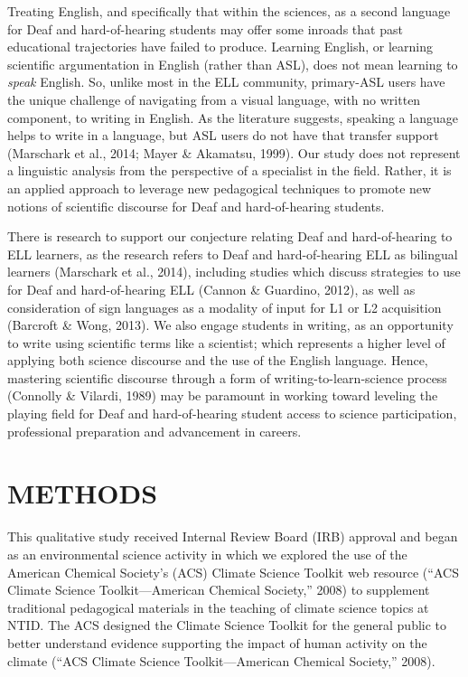 \documentclass[11.5pt]{sig-alternate} %
\begin{document}
\begin{large}
Treating English, and specifically that within the sciences, as a second language for Deaf and hard-of-hearing students may offer some inroads that past educational trajectories have failed to produce. Learning English, or learning scientific argumentation in English (rather than ASL), does not mean learning to \textit{speak} English. So, unlike most in the ELL community, primary-ASL users have the unique challenge of navigating from a visual language, with no written component, to writing in English. As the literature suggests, speaking a language helps to write in a language, but ASL users do not have that transfer support (Marschark et al., 2014; Mayer \& Akamatsu, 1999). Our study does not represent a linguistic analysis from the perspective of a specialist in the field. Rather, it is an applied approach to leverage new pedagogical techniques to promote new notions of scientific discourse for Deaf and hard-of-hearing students. 

There is research to support our conjecture relating Deaf and hard-of-hearing to ELL learners, as the research refers to Deaf and hard-of-hearing ELL as bilingual learners (Marschark et al., 2014), including studies which discuss strategies to use for Deaf and hard-of-hearing ELL (Cannon \& Guardino, 2012), as well as consideration of sign languages as a modality of input for L1 or L2 acquisition (Barcroft \& Wong, 2013). We also engage students in writing, as an opportunity to write using scientific terms like a scientist; which represents a higher level of applying both science discourse and the use of the English language. Hence, mastering scientific discourse through a form of writing-to-learn-science process (Connolly \& Vilardi, 1989) may be paramount in working toward leveling the playing field for Deaf and hard-of-hearing student access to science participation, professional preparation and advancement in careers. 

\section*{METHODS}

This qualitative study received Internal Review Board (IRB) approval and began as an environmental science activity in which we explored the use of the American Chemical Society’s (ACS) Climate Science Toolkit web resource (“ACS Climate Science Toolkit—American Chemical Society,” 2008) to supplement traditional pedagogical materials in the teaching of climate science topics at NTID. The ACS designed the Climate Science Toolkit for the general public to better understand evidence supporting the impact of human activity on the climate (“ACS Climate Science Toolkit—American Chemical Society,” 2008). 


\end{large}
\end{document}
